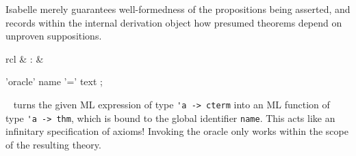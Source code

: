 \begin{isabellebody}
\begin{isamarkuptext}
  Isabelle merely guarantees well-formedness of the propositions being
  asserted, and records within the internal derivation object how
  presumed theorems depend on unproven suppositions.

  \begin{matharray}{rcl}
    \hypertarget{command.oracle}{\hyperlink{command.oracle}{\mbox{}}} & : &  \\
  \end{matharray}

  \begin{rail}
    'oracle' name '=' text
    ;
  \end{rail}

  \begin{description}

  \item \hyperlink{command.oracle}{\mbox{}}~ turns the given ML
  expression  of type \verb|'a -> cterm| into an
  ML function of type \verb|'a -> thm|, which is bound to the
  global identifier \verb|name|.  This acts like an infinitary
  specification of axioms!  Invoking the oracle only works within the
  scope of the resulting theory.

  \end{description}


\end{isamarkuptext}
\end{isabellebody}

